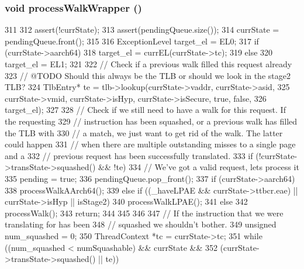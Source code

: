 \hypertarget{classArmISA_1_1TableWalker_a3e744e2a92a9edac5d9859823bb1ccc8}{
\subsubsection[{processWalkWrapper}]{\setlength{\rightskip}{0pt plus 5cm}void processWalkWrapper ()}}
\label{classArmISA_1_1TableWalker_a3e744e2a92a9edac5d9859823bb1ccc8}



\begin{DoxyCode}
311 {
312     assert(!currState);
313     assert(pendingQueue.size());
314     currState = pendingQueue.front();
315 
316     ExceptionLevel target_el = EL0;
317     if (currState->aarch64)
318         target_el = currEL(currState->tc);
319     else
320         target_el = EL1;
321 
322     // Check if a previous walk filled this request already
323     // @TODO Should this always be the TLB or should we look in the stage2 TLB?
324     TlbEntry* te = tlb->lookup(currState->vaddr, currState->asid,
325             currState->vmid, currState->isHyp, currState->isSecure, true, false,
326             target_el);
327 
328     // Check if we still need to have a walk for this request. If the requesting
329     // instruction has been squashed, or a previous walk has filled the TLB with
330     // a match, we just want to get rid of the walk. The latter could happen
331     // when there are multiple outstanding misses to a single page and a
332     // previous request has been successfully translated.
333     if (!currState->transState->squashed() && !te) {
334         // We've got a valid request, lets process it
335         pending = true;
336         pendingQueue.pop_front();
337         if (currState->aarch64)
338             processWalkAArch64();
339         else if ((_haveLPAE && currState->ttbcr.eae) || currState->isHyp || 
      isStage2)
340             processWalkLPAE();
341         else
342             processWalk();
343         return;
344     }
345 
346 
347     // If the instruction that we were translating for has been
348     // squashed we shouldn't bother.
349     unsigned num_squashed = 0;
350     ThreadContext *tc = currState->tc;
351     while ((num_squashed < numSquashable) && currState &&
352            (currState->transState->squashed() || te)) {
}}
\end{DoxyCode}
